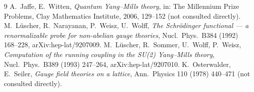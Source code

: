 \documentclass[11pt,a4paper]{article}
\theoremstyle{definition}
\theoremstyle{remark}
\begin{document}
\begin{thebibliography}{9}
 A.~Jaffe, E.~Witten, \emph{Quantum Yang--Mills theory}, in: The Millennium Prize Problems, Clay Mathematics Institute, 2006, 129--152 (not consulted directly).
 M.~Lüscher, R.~Narayanan, P.~Weisz, U.~Wolff, \emph{The Schrödinger functional --- a renormalizable probe for non-abelian gauge theories}, Nucl.\ Phys.\ B384 (1992) 168--228, arXiv:hep-lat/9207009.
 M.~Lüscher, R.~Sommer, U.~Wolff, P.~Weisz, \emph{Computation of the running coupling in the SU(2) Yang--Mills theory}, Nucl.\ Phys.\ B389 (1993) 247--264, arXiv:hep-lat/9207010.
 K.~Osterwalder, E.~Seiler, \emph{Gauge field theories on a lattice}, Ann.\ Physics 110 (1978) 440--471 (not consulted directly).
\end{thebibliography}
\end{document}
